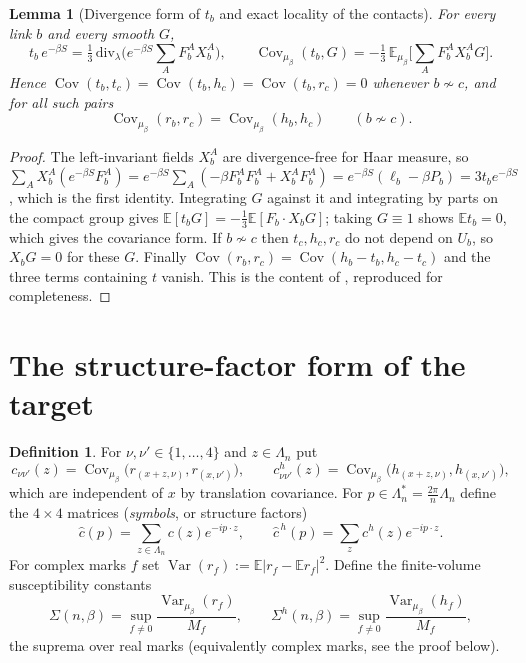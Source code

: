\documentclass[11pt]{article}
\newtheorem{lemma}[theorem]{Lemma}
\theoremstyle{definition}
\newtheorem{definition}[theorem]{Definition}
\newcommand{\E}{\mathbb{E}}
\newcommand{\Var}{\operatorname{Var}}
\newcommand{\Cov}{\operatorname{Cov}}
\begin{document}
\begin{lemma}[Divergence form of $t_b$ and exact locality of the contacts]\label{lem:locality}
For every link $b$ and every smooth $G$,
\begin{equation}\label{eq:div}
t_b\,e^{-\beta S}=\tfrac13\,\mathrm{div}_\lambda\big(e^{-\beta S}\textstyle\sum_AF_b^AX_b^A\big),\qquad
\Cov_{\mu_\beta}(t_b,G)=-\tfrac13\,\E_{\mu_\beta}\Big[\sum_AF_b^AX_b^AG\Big].
\end{equation}
Hence $\Cov(t_b,t_c)=\Cov(t_b,h_c)=\Cov(t_b,r_c)=0$ whenever $b\not\sim c$, and for all such pairs
\begin{equation}\label{eq:rh}
\Cov_{\mu_\beta}(r_b,r_c)=\Cov_{\mu_\beta}(h_b,h_c)\qquad (b\not\sim c).
\end{equation}
\end{lemma}
\begin{proof}
The left-invariant fields $X_b^A$ are divergence-free for Haar measure, so
$\sum_AX_b^A(e^{-\beta S}F_b^A)=e^{-\beta S}\sum_A(-\beta F_b^AF_b^A+X_b^AF_b^A)=e^{-\beta S}(\ell_b-\beta P_b)=3t_be^{-\beta S}$,
which is the first identity. Integrating $G$ against it and integrating by parts on the compact group gives
$\E[t_bG]=-\tfrac13\E[F_b\cdot X_bG]$; taking $G\equiv1$ shows $\E t_b=0$, which gives the covariance form.
If $b\not\sim c$ then $t_c,h_c,r_c$ do not depend on $U_b$, so $X_bG=0$ for these $G$. Finally
$\Cov(r_b,r_c)=\Cov(h_b-t_b,h_c-t_c)$ and the three terms containing $t$ vanish.
This is the content of \cite[subsection ``Local Ward moments and the finite-range contact matrix'']{wwa}, reproduced for completeness.
\end{proof}

\section{The structure-factor form of the target}\label{sec:symbol}

\begin{definition}\label{def:symbol}
For $\nu,\nu'\in\{1,\dots,4\}$ and $z\in\Lambda_n$ put
\[
c_{\nu\nu'}(z)=\Cov_{\mu_\beta}\big(r_{(x+z,\nu)},r_{(x,\nu')}\big),\qquad
c^h_{\nu\nu'}(z)=\Cov_{\mu_\beta}\big(h_{(x+z,\nu)},h_{(x,\nu')}\big),
\]
which are independent of $x$ by translation covariance. For $p\in\Lambda_n^*=\frac{2\pi}{n}\Lambda_n$ define the
$4\times4$ matrices (\emph{symbols}, or structure factors)
\[
\hat c(p)=\sum_{z\in\Lambda_n}c(z)e^{-ip\cdot z},\qquad \hat c^{\,h}(p)=\sum_zc^h(z)e^{-ip\cdot z}.
\]
For complex marks $f$ set $\Var(r_f):=\E|r_f-\E r_f|^2$. Define the finite-volume susceptibility constants
\[
\Sigma(n,\beta)=\sup_{f\ne0}\frac{\Var_{\mu_\beta}(r_f)}{M_f},\qquad
\Sigma^h(n,\beta)=\sup_{f\ne0}\frac{\Var_{\mu_\beta}(h_f)}{M_f},
\]
the suprema over real marks (equivalently complex marks, see the proof below).
\end{definition}
\end{document}
